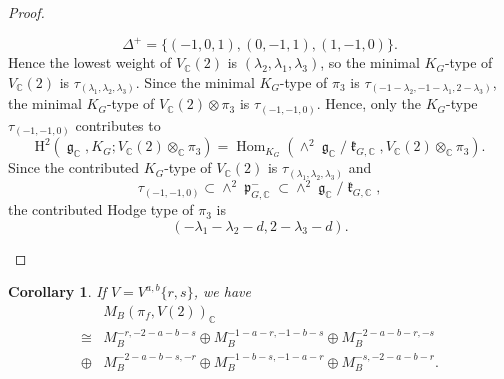 \documentclass[11pt, a4paper]{amsart}
\theoremstyle{plain}
\newtheorem{corollary}[theorem]{Corollary}
\theoremstyle{definition}
\numberwithin{equation}{section}
\def\CC{\mathbb{C}}
\DeclareMathOperator{\Hom}{Hom}
\DeclareMathOperator{\lieg}{\mathfrak g}
\DeclareMathOperator{\liek}{\mathfrak k}
\DeclareMathOperator{\liep}{\mathfrak p}
\begin{document}
\begin{proof}
\begin{enumerate}
                           \begin{equation*}
                                \Delta^{+} = \{(-1,  0, 1), (0, -1, 1), (1, -1, 0) \}. 
                           \end{equation*}
                           Hence the lowest weight of $V_{\CC}(2)$ is $(\lambda_2, \lambda_1, \lambda_3)$, so the minimal $K_{G}$-type of $V_{\CC}(2)$ is $\tau_{(\lambda_1, \lambda_2, \lambda_3)}$. 
                           Since the minimal $K_{G}$-type of $\pi_3$ is $\tau_{(-1 - \lambda_2, -1 - \lambda_1,  2- \lambda_3)}$, the minimal $K_{G}$-type of 
                           $V_{\CC}(2) \otimes \pi_3$ is $\tau_{(-1, -1, 0)}$. Hence, only the $K_{G}$-type $\tau_{(-1, -1, 0)}$ contributes to 
                           \begin{equation*}
                               \mathrm{H}^{2}(\lieg_{\CC}, K_{G}; V_{\CC}(2) \otimes_{\CC} \pi_{3}) = \Hom_{K_G}(\wedge^{2} \lieg_{\CC} / \liek_{G, \CC}, V_{\CC}(2) \otimes_{\CC} \pi_{3}). 
                           \end{equation*}
                           Since the contributed $K_{G}$-type of $V_{\CC}(2)$ is $\tau_{(\lambda_1, \lambda_2, \lambda_3)}$ and 
                           \begin{equation*}
                               \tau_{(-1,-1,0)} \subset \wedge^{2} \liep_{G, \CC}^{-} \subset \wedge^{2} \lieg_{\CC} / \liek_{G, \CC}, 
                           \end{equation*}
                           the contributed Hodge type of $\pi_3$ is 
                           \begin{equation*}
                               ( -\lambda_1 - \lambda_2 - d, 2 -\lambda_3 - d).
                           \end{equation*}
    \end{enumerate}
\end{proof}

\begin{corollary}
\label{Corollary: Hodge decomp for motives}
If $V = V^{a, b} \{r, s\}$, we have 
\begin{align*}
        & M_{B}({\pi}_f, V(2))_{\CC} \\
        \cong & M_{B}^{-r, -2 - a - b - s} \oplus M_{B}^{-1 - a - r, -1 - b - s} \oplus M_{B}^{-2 - a - b - r, -s} \\
        \oplus & M_{B}^{ -2 - a - b - s, -r} \oplus M_{B}^{-1 - b - s, -1 - a - r} \oplus M_{B}^{-s, -2 -a -b - r}.  
\end{align*}
\end{corollary}
\end{document}
